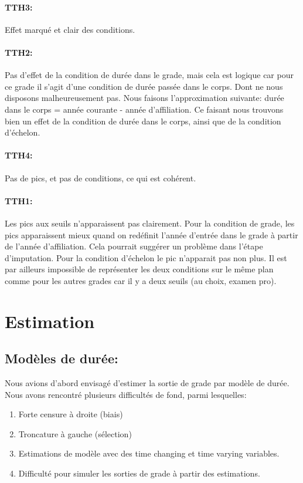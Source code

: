 \documentclass[11pt,a4paper]{article}
\begin{document}
\paragraph{TTH3:} Effet marqué et clair des conditions.

\paragraph{TTH2:} Pas d'effet de la condition de durée dans le grade, mais cela est logique car pour ce grade il s'agit d'une condition de durée passée dans le corps. Dont ne nous disposons malheureusement pas. Nous faisons l'approximation suivante: durée dans le corps = année courante - année d'affiliation. Ce faisant nous trouvons bien un effet de la condition de durée dans le corps, ainsi que de la condition d'échelon. 

\paragraph{TTH4:} Pas de pics, et pas de conditions, ce qui est cohérent. 
 
\paragraph{TTH1:} Les pics aux seuils n'apparaissent pas clairement. Pour la condition de grade, les pics apparaissent mieux quand on redéfinit l'année d'entrée dans le grade à partir de l'année d'affiliation. Cela pourrait suggérer un problème dans l'étape d'imputation. 
Pour la condition d'échelon le pic n'apparait pas non plus. Il est par ailleurs impossible de représenter les deux conditions sur le même plan comme pour les autres grades car il y a deux seuils (au choix, examen pro). 


\section{Estimation}

\subsection*{Modèles de durée:} 

Nous avions d'abord envisagé d'estimer la sortie de grade par modèle de durée. Nous avons rencontré plusieurs difficultés de fond, parmi lesquelles: 

\begin{enumerate}
\item Forte censure à droite (biais)
\item Troncature à gauche (sélection)
\item Estimations de modèle avec des \og time changing \fg{} et \og time varying \fg{} variables. 
\item Difficulté pour simuler les sorties de grade à partir des estimations. 
\end{enumerate}
\end{document}
